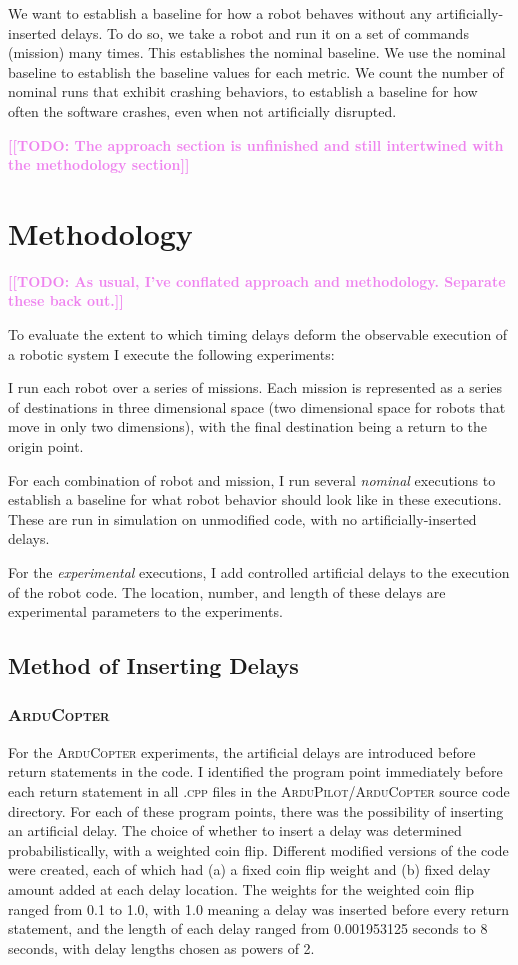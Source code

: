 \documentclass[conference]{IEEEtran}
\newcommand{\todo}[1]{\textcolor{violet}{{\bfseries [[TODO: #1]]}}}
\newcommand{\tool}[1]{\textsc{#1}}
\begin{document}
We want to establish a baseline for how a robot behaves without any artificially-inserted delays. To do so, we take a robot and run it on a set of commands (mission) many times.
This establishes the nominal baseline.
We use the nominal baseline to establish the baseline values for each metric.
We count the number of nominal runs that exhibit crashing behaviors, to establish a baseline for how often the software crashes, even when not artificially disrupted.

\todo{The approach section is unfinished and still intertwined with the methodology section}

\section{Methodology}
\label{sec:timing-methodology}
\todo{As usual, I've conflated approach and methodology. Separate these back out.}

To evaluate the extent to which timing delays deform the observable execution of a robotic system I execute the following experiments:

I run each robot over a series of missions. Each mission is represented as a series of destinations in three dimensional space (two dimensional space for robots that move in only two dimensions), with the final destination being a return to the origin point.

For each combination of robot and mission, I run several \emph{nominal} executions to establish a baseline for what robot behavior should look like in these executions. These are run in simulation on unmodified code, with no artificially-inserted delays.

For the \emph{experimental} executions, I add controlled artificial delays to the execution of the robot code.
The location, number, and length of these delays are experimental parameters to the experiments.
\subsection{Method of Inserting Delays}
\label{sec:timing-methodology-delays}

\subsubsection{\tool{ArduCopter}} 
For the \tool{ArduCopter} experiments, the artificial delays are introduced before return statements in the code.
I identified the program point immediately before 
each return statement in all \tool{.cpp} files in the 
\tool{ArduPilot/ArduCopter} source code directory.
For each of these program points, there was the possibility of inserting an 
artificial delay.
The choice of whether to insert a delay was determined probabilistically, with a weighted coin flip. 
Different modified versions of the code were created, each of which had 
(a) a fixed coin flip weight and 
(b) fixed delay amount added at each delay location. 
The weights for the weighted coin flip ranged from 0.1 to 1.0, with 1.0
meaning a delay was inserted before every return statement, 
and the length of each delay ranged from 0.001953125 seconds to 8 seconds, 
with delay lengths chosen as powers of 2.
\end{document}
